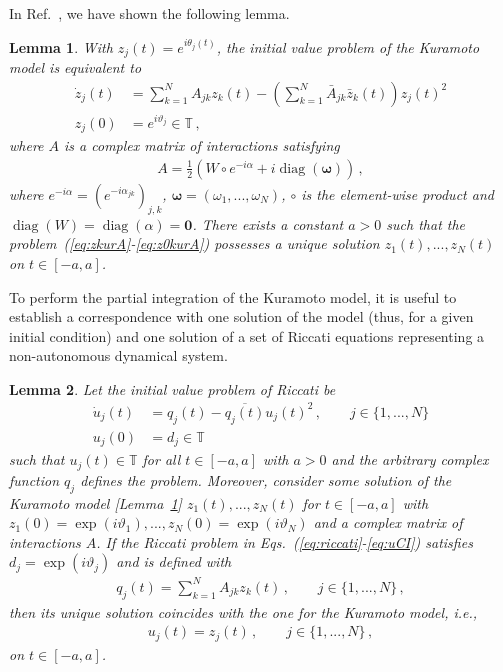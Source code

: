 \documentclass[10pt,a4paper]{amsart}
\newtheorem{lemma}{Lemma}
\DeclareMathOperator{\diag}{diag}
\begin{document}
In Ref.~\cite{Thibeault2026}, we have shown the following lemma.
\begin{lemma}\label{lem:correspondance_complexe_A}
    With $z_j(t) = e^{i\theta_j(t)}$, the initial value problem of the Kuramoto model is equivalent to 
\begin{align}
    \dot{z}_j(t) &= \sum_{k=1}^NA_{jk}z_k(t) - \left(\sum_{k=1}^N\bar{A}_{jk}\bar{z}_k(t) \right)z_j(t)^2 \label{eq:zkurA}\\
    z_j(0) &= e^{i\vartheta_j}  \in \mathbb{T}\label{eq:z0kurA}\,,
\end{align}
where $A$ is a complex matrix of interactions satisfying
\begin{align}
    A = \frac{1}{2}\left(W \circ e^{-i\alpha} + i\diag(\bm{\omega})\right)\,,
\end{align}
where $e^{-i\alpha} = (e^{-i\alpha_{jk}})_{j,k}$, $\bm{\omega} = (\omega_1,...,\omega_N)$, $\circ$ is the element-wise product and $\diag(W) = \diag(\alpha) = \bm{0}$. There exists a constant $a > 0$ such that the problem~(\ref{eq:zkurA}-\ref{eq:z0kurA}) possesses a unique solution $z_1(t),..., z_N(t)$ on $t\in[-a, a]$.
\end{lemma}
To perform the partial integration of the Kuramoto model, it is useful to establish a correspondence with one solution of the model (thus, for a given initial condition) and one solution of a set of Riccati equations representing a non-autonomous dynamical system.

\begin{lemma}\label{lem:correspondance_nonautonome}
    Let the initial value problem of Riccati be
    \begin{align}
        \dot{u}_j(t) &= q_j(t) - \overline{q_j(t)}u_j(t)^2\,,\qquad j\in\{1,...,N\}\label{eq:riccati}\\
        u_j(0) &= d_j \in \mathbb{T} \label{eq:uCI}
    \end{align} %
    such that $u_j(t)\in\mathbb{T}$ for all $t \in [-a, a]$ with $a > 0$ and the arbitrary complex function $q_j$ defines the problem. Moreover, consider some solution of the Kuramoto model [Lemma~\ref{lem:correspondance_complexe_A}] $z_1(t), ..., z_N(t)$ for $t \in [-a, a]$ with $z_1(0) = \exp(i\vartheta_1), ..., z_N(0) = \exp(i\vartheta_N)$ and a complex matrix of interactions $A$. If the Riccati problem in Eqs.~(\ref{eq:riccati}-\ref{eq:uCI}) satisfies $d_j = \exp(i\vartheta_j)$ and is defined with
    \begin{align}\label{eq:pj_to_qj}
        q_j(t) = \textstyle{\sum_{k=1}^N} A_{jk}z_k(t)\,, \qquad j\in\{1,...,N\}\,,%
    \end{align}
    then its unique solution coincides with the one for the Kuramoto model, i.e.,
    \begin{align*}
        u_j(t) = z_j(t)\,,\qquad j\in\{1,...,N\}\,,
    \end{align*}
    on $t \in [-a, a]$. 
\end{lemma}
\end{document}
